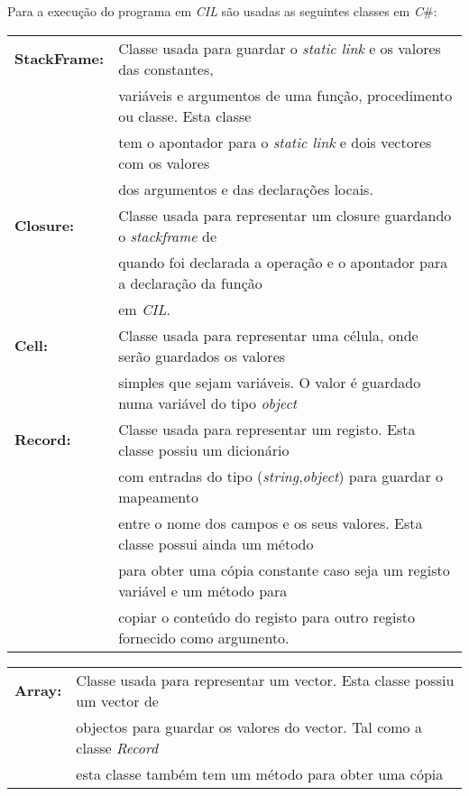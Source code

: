 Para a execução do programa em \emph{CIL} são usadas as seguintes classes em 
\emph{C}\#:\\

{
\fontsize{9pt}{10}\selectfont
\begin{tabular}{ll}
\textbf{StackFrame:}	&Classe usada para guardar o \emph{static link} e os 
													valores das constantes, \\
						&variáveis e argumentos de uma função, procedimento ou 
														classe. Esta classe \\
					&tem o apontador para o \emph{static link} e dois vectores 
															com os valores \\
					&dos argumentos e das declarações locais.\\
\hline
\textbf{Closure:}	&Classe usada para representar um closure guardando o 
														\emph{stackframe} de \\
					&quando foi declarada a operação e o apontador para a 
														declaração da função \\
					&em \emph{CIL}. \\
\hline
\textbf{Cell:}		&Classe usada para representar uma célula, onde serão 
														guardados os valores \\ 
					&simples que sejam variáveis. O valor é guardado numa 
												variável do tipo \emph{object}\\
\hline
\textbf{Record:}	&Classe usada para representar um registo. Esta classe 
														possiu um dicionário \\
					&com entradas do tipo (\emph{string},\emph{object}) para 
														guardar o mapeamento \\
					&entre o nome dos campos e os seus valores. Esta classe 
													possui ainda um método \\
					&para obter uma cópia constante caso seja um registo 
													variável e um método para \\
					&copiar o conteúdo do registo para outro registo fornecido 
															como argumento.\\
\end{tabular}
\newpage
\begin{tabular}{ll}
\textbf{Array:}		&Classe usada para representar um vector. Esta classe 
														possiu um vector de \\
					&objectos para guardar os valores do vector. Tal como a	 
														classe \emph{Record} \\
					&esta classe também tem um método para obter uma cópia 

\end{tabular}}
